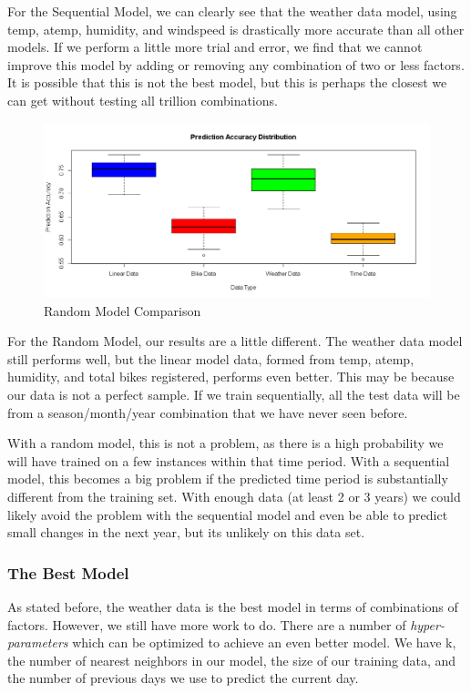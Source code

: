 \documentclass[12pt]{article}
\begin{document}
For the Sequential Model, we can clearly see that the weather data model, using temp, atemp, humidity, and windspeed is drastically more accurate than all other models. If we perform a little more trial and error, we find that we cannot improve this model by adding or removing any combination of two or less factors. It is possible that this is not the best model, but this is perhaps the closest we can get without testing all trillion combinations. 

\begin{figure}[H]
	\centering
  	\includegraphics[width=150mm]{"Random Model Comparison"}
 	\caption{Random Model Comparison}
 	\label{Random Model Comparison}
\end{figure}

For the Random Model, our results are a little different. The weather data model still performs well, but the linear model data, formed from temp, atemp, humidity, and total bikes registered, performs even better. This may be because our data is not a perfect sample. If we train sequentially, all the test data will be from a season/month/year combination that we have never seen before. 

With a random model, this is not a problem, as there is a high probability we will have trained on a few instances within that time period. With a sequential model, this becomes a big problem if the predicted time period is substantially different from the training set. With enough data (at least 2 or 3 years) we could likely avoid the problem with the sequential model and even be able to predict small changes in the next year, but its unlikely on this data set.

\subsubsection{The Best Model}
As stated before, the weather data is the best model in terms of combinations of factors. However, we still have more work to do. There are a number of \textit{hyper-parameters} which can be optimized to achieve an even better model. We have k, the number of nearest neighbors in our model, the size of our training data, and the number of previous days we use to predict the current day. 
\end{document}
